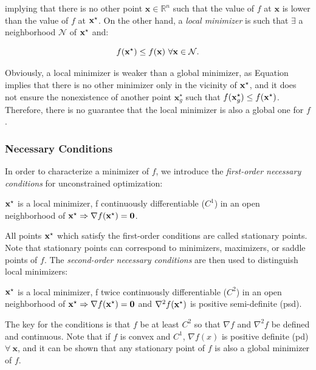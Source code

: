 implying that there is no other point $\mathbf{x}\in\mathbb R^n$ such
that the value of $f$ at $\mathbf{x}$ is lower than the value of $f$
at $\mathbf{x}^{\star}$. On the other hand, a \emph{local minimizer} is such
that $\exists$ a neighborhood $\mathcal{N}$ of $\mathbf{x}^{\star}$ and:

\begin{equation}
\label{eq:chap3-local-min}
  f(\mathbf{x}^{\star}) \le f(\mathbf{x})~\forall \mathbf{x} \in \mathcal{N}.
\end{equation}

Obviously, a local minimizer is weaker than a global minimizer, as
Equation  implies that there is no other
minimizer only in the vicinity of $\mathbf{x}^{\star}$, and it does not ensure
the nonexistence of another point $\mathbf{x}^\star_g$ such that
$f(\mathbf{x}^\star_g) \le f(\mathbf{x}^{\star})$. Therefore, there is no
guarantee that the local minimizer is also a global one for $f$.

\subsubsection{Necessary Conditions}

In order to characterize a minimizer of $f$, we introduce the
\emph{first-order necessary conditions} for unconstrained
optimization:

\begin{theorem}
\label{thm:chap3-first-order-cond}
$\mathbf{x}^{\star}$ is a local minimizer, f continuously differentiable
($C^1$) in an open neighborhood of $\mathbf{x}^{\star} \Rightarrow
\nabla f(\mathbf{x}^{\star}) = \mathbf{0}$.
\end{theorem}

All points $\mathbf{x}^{\star}$ which satisfy the first-order conditions are
called stationary points. Note that stationary points can correspond
to minimizers, maximizers, or saddle points of $f$. The
\emph{second-order necessary conditions} are then used to distinguish
local minimizers:

\begin{theorem}
\label{thm:chap3-second-order-cond}
$\mathbf{x}^{\star}$ is a local minimizer, f twice continuously differentiable
($C^2$) in an open neighborhood of $\mathbf{x}^{\star} \Rightarrow \nabla
f(\mathbf{x}^{\star}) = \mathbf{0}$ and $\nabla^2 f(\mathbf{x}^{\star})$ is positive
semi-definite (psd).
\end{theorem}

The key for the conditions is that $f$ be at least $C^2$ so that
$\nabla f$ and $\nabla^2 f$ be defined and continuous. Note that if
$f$ is convex and $C^1$, $\nabla f(x)$ is positive definite (pd)
$\forall~\mathbf{x}$, and it can be shown that any stationary point of
$f$ is also a global minimizer of $f$.

